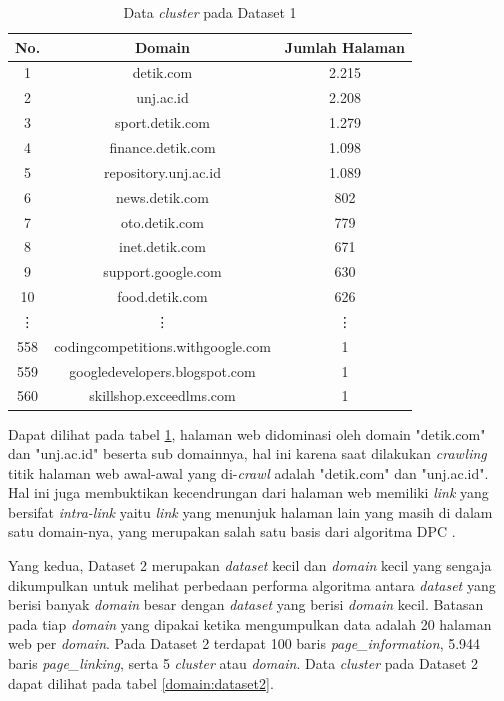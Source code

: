 \begin{longtable}{|c|c|c|}
\caption{Data \textit{cluster} pada Dataset 1}
\label{domain:dataset1} \\
\hline
\textbf{No.} & \textbf{Domain} & \textbf{Jumlah Halaman} \\
\hline
1 & detik.com & 2.215 \\
2 & unj.ac.id & 2.208 \\
3 & sport.detik.com & 1.279 \\
4 & finance.detik.com & 1.098 \\
5 & repository.unj.ac.id & 1.089 \\
6 & news.detik.com & 802 \\
7 & oto.detik.com & 779 \\
8 & inet.detik.com & 671 \\
9 & support.google.com & 630 \\
10 & food.detik.com & 626 \\
\vdots & \vdots & \vdots \\
558 & codingcompetitions.withgoogle.com & 1 \\
559 & googledevelopers.blogspot.com & 1 \\
560 & skillshop.exceedlms.com & 1 \\
\hline
\end{longtable}

Dapat dilihat pada tabel \ref{domain:dataset1}, halaman web didominasi oleh domain "detik.com" dan "unj.ac.id" beserta sub domainnya, hal ini karena saat dilakukan \textit{crawling} titik halaman web awal-awal yang di-\textit{crawl} adalah "detik.com" dan "unj.ac.id". Hal ini juga membuktikan kecendrungan dari halaman web memiliki \textit{link} yang bersifat \textit{intra-link} yaitu \textit{link} yang menunjuk halaman lain yang masih di dalam satu domain-nya, yang merupakan salah satu basis dari algoritma DPC \citep{zhuetal2005distributedPagerank}. 

Yang kedua, Dataset 2 merupakan \textit{dataset} kecil dan \textit{domain} kecil yang sengaja dikumpulkan untuk melihat perbedaan performa algoritma antara \textit{dataset} yang berisi banyak \textit{domain} besar dengan \textit{dataset} yang berisi \textit{domain} kecil. Batasan pada tiap \textit{domain} yang dipakai ketika mengumpulkan data adalah 20 halaman web per \textit{domain}. Pada Dataset 2 terdapat 100 baris \textit{page\_information}, 5.944 baris \textit{page\_linking}, serta 5 \textit{cluster} atau \textit{domain}. Data \textit{cluster} pada Dataset 2 dapat dilihat pada tabel \ref{domain:dataset2}.

